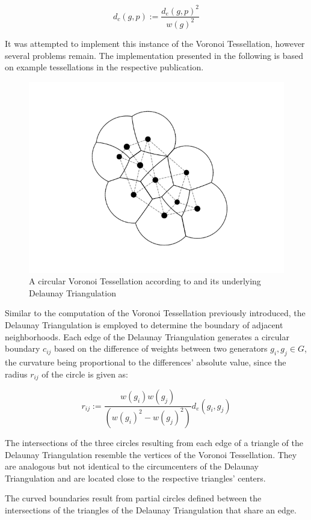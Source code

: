 \documentclass[a4paper]{article}
\begin{document}
\[d_c(g, p) := \frac{d_e(g, p)^2}{w(g)^2}\]

It was attempted to implement this instance of the Voronoi Tessellation, however several problems remain.
The implementation presented in the following is based on example tessellations in the respective publication.

\begin{figure}[H]
	\includegraphics[width=\textwidth]{circular_voronoi_tessellation.png}
	\caption{A circular Voronoi Tessellation according to \cite{Bock2010} and its underlying Delaunay Triangulation}
\end{figure}

Similar to the computation of the Voronoi Tessellation previously introduced, the Delaunay Triangulation is
employed to determine the boundary of adjacent neighborhoods. Each edge of the Delaunay Triangulation
generates a circular boundary \(c_{ij}\) based on the difference of weights between two generators \(g_i, g_j \in G\), the
curvature being proportional to the differences' absolute value, since the radius \(r_{ij}\) of the circle is given as:

\[r_{ij} := \frac{w(g_i)w(g_j)}{(w(g_i)^2 - w(g_j)^2)}d_e(g_i, g_j)\]

The intersections of the three circles resulting from each edge of a triangle of the Delaunay Triangulation
resemble the vertices of the Voronoi Tessellation. They are analogous but not identical to the circumcenters of
the Delaunay Triangulation and are located close to the respective triangles' centers.

The curved boundaries result from partial circles defined between the intersections
of the triangles of the Delaunay Triangulation that share an edge.
\end{document}
